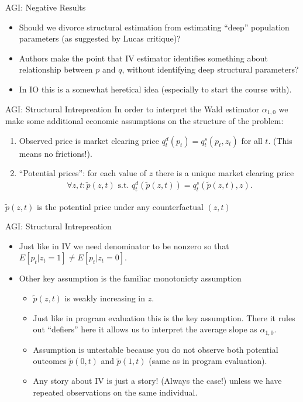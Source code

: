 \documentclass[xcolor=pdftex,dvipsnames,table,mathserif]{beamer}
\begin{document}
\begin{frame}{AGI: Negative Results}
\begin{itemize}
\item Should we divorce structural estimation from estimating ``deep'' population parameters (as suggested by Lucas critique)?
\item Authors make the point that IV estimator identifies something about relationship between $p$ and $q$, without identifying deep structural parameters?
\item In IO this is a somewhat heretical idea (especially to start the course with).
\end{itemize}
\end{frame}

\begin{frame}{AGI: Structural Intrepreation}
In order to interpret the Wald estimator $\alpha_{1,0}$ we make some additional \alert{economic} assumptions on the structure of the problem:
\begin{enumerate}
\item Observed price is market clearing price $q_t^d(p_t) = q_t^s(p_t,z_t)$ for all $t$. (This means no frictions!).
\item ``Potential prices'': for each value of $z$ there is a unique market clearing price
\begin{eqnarray*}
\forall z,t : \tilde{p}(z,t) \mbox{ s.t. } q_t^d(\tilde{p}(z,t)) = q_t^s(\tilde{p}(z,t),z).
\end{eqnarray*}
\end{enumerate}
$\tilde{p}(z,t)$ is the potential price under any counterfactual $(z,t)$
\end{frame}


\begin{frame}{AGI: Structural Intrepreation}
\begin{itemize}
\item Just like in IV we need denominator to be nonzero so that
$E[p_t | z_t=1] \neq E[p_t | z_t = 0]$.
\item Other key assumption is the familiar \alert{monotonicty} assumption
\begin{itemize}
\item $\tilde{p}(z,t)$ is weakly increasing in $z$.
\item Just like in program evaluation this is the key assumption. There it rules out ``defiers'' here it allows us to interpret the \alert{average slope} as $\alpha_{1,0}$.
\item Assumption is untestable because you do not observe both potential outcomes $\tilde{p}(0,t)$ and $\tilde{p}(1,t)$ (same as in program evaluation).
\item Any story about IV is just a story! (Always the case!) unless we have repeated observations on the same individual.
\end{itemize}
\end{itemize}
\end{frame}
\end{document}
